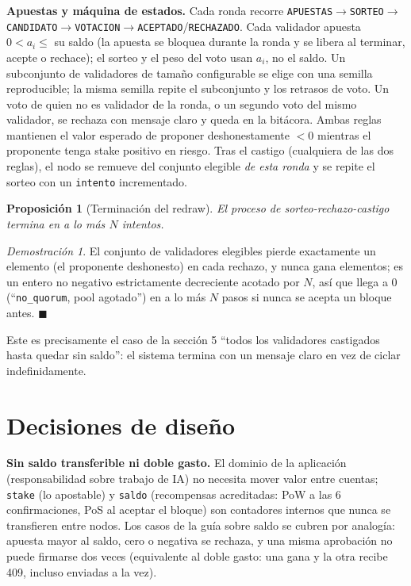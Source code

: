 \documentclass[11pt]{article}
\newtheorem{prop}{Proposición}
\theoremstyle{remark}
\newtheorem*{proof*}{Demostración}
\begin{document}
\textbf{Apuestas y máquina de estados.} Cada ronda recorre \texttt{APUESTAS}$\to$\texttt{SORTEO}$\to$\texttt{CANDIDATO}$
\to$\texttt{VOTACION}$\to$\texttt{ACEPTADO}/\texttt{RECHAZADO}. Cada validador apuesta $0<a_i\le$ su saldo (la apuesta se
bloquea durante la ronda y se libera al terminar, acepte o rechace); el sorteo y el peso del voto usan $a_i$, no el saldo. Un
subconjunto de validadores de tamaño configurable se elige con una semilla reproducible; la misma semilla repite el subconjunto
y los retrasos de voto. Un voto de quien no es validador de la ronda, o un segundo voto del mismo validador, se rechaza con
mensaje claro y queda en la bitácora. Ambas reglas mantienen el valor esperado de proponer
deshonestamente $<0$ mientras el proponente tenga stake positivo en riesgo. Tras el castigo (cualquiera de las dos
reglas), el nodo se remueve del conjunto elegible \emph{de esta ronda} y se repite el sorteo con un \texttt{intento}
incrementado.

\begin{prop}[Terminación del redraw]
El proceso de sorteo-rechazo-castigo termina en a lo más $N$ intentos.
\end{prop}
\begin{proof*}
El conjunto de validadores elegibles pierde exactamente un elemento (el proponente deshonesto) en cada rechazo, y nunca
gana elementos; es un entero no negativo estrictamente decreciente acotado por $N$, así que llega a $0$ (``\texttt{no\_quorum},
pool agotado'') en a lo más $N$ pasos si nunca se acepta un bloque antes. $\blacksquare$
\end{proof*}
Este es precisamente el caso de la sección 5 ``todos los validadores castigados hasta quedar sin saldo'': el sistema
termina con un mensaje claro en vez de ciclar indefinidamente.

\section{Decisiones de diseño}
\textbf{Sin saldo transferible ni doble gasto.} El dominio de la aplicación (responsabilidad sobre trabajo de IA) no
necesita mover valor entre cuentas; \texttt{stake} (lo apostable) y \texttt{saldo} (recompensas acreditadas: PoW a las 6
confirmaciones, PoS al aceptar el bloque) son contadores internos que nunca se transfieren entre nodos. Los casos de la guía
sobre saldo se cubren por analogía: apuesta mayor al saldo, cero o negativa se rechaza, y una misma aprobación no puede firmarse
dos veces (equivalente al doble gasto: una gana y la otra recibe 409, incluso enviadas a la vez).
\end{document}
